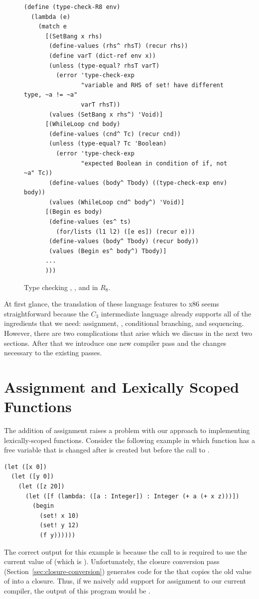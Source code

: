 \documentclass[11pt]{book}
\begin{document}
\begin{figure}[tbp]
\begin{lstlisting}[basicstyle=\ttfamily\footnotesize]
(define (type-check-R8 env)
  (lambda (e)
    (match e
      [(SetBang x rhs)
       (define-values (rhs^ rhsT) (recur rhs))
       (define varT (dict-ref env x))
       (unless (type-equal? rhsT varT)
         (error 'type-check-exp
                "variable and RHS of set! have different type, ~a != ~a"
                varT rhsT))
       (values (SetBang x rhs^) 'Void)]
      [(WhileLoop cnd body)
       (define-values (cnd^ Tc) (recur cnd))
       (unless (type-equal? Tc 'Boolean)
         (error 'type-check-exp
                "expected Boolean in condition of if, not ~a" Tc))
       (define-values (body^ Tbody) ((type-check-exp env) body))
       (values (WhileLoop cnd^ body^) 'Void)]
      [(Begin es body)
       (define-values (es^ ts)
         (for/lists (l1 l2) ([e es]) (recur e)))
       (define-values (body^ Tbody) (recur body))
       (values (Begin es^ body^) Tbody)]
      ...
      )))
\end{lstlisting}
\caption{Type checking , ,
    and  in $R_8$.}
\label{fig:type-check-R8}
\end{figure}


  
At first glance, the translation of these language features to x86
seems straightforward because the $C_3$ intermediate language already
supports all of the ingredients that we need: assignment, ,
conditional branching, and sequencing. However, there are two
complications that arise which we discuss in the next two
sections. After that we introduce one new compiler pass and the
changes necessary to the existing passes.

\section{Assignment and Lexically Scoped Functions}
\label{sec:assignment-scoping}

The addition of assignment raises a problem with our approach to
implementing lexically-scoped functions. Consider the following
example in which function  has a free variable  that
is changed after  is created but before the call to .
\begin{lstlisting}
(let ([x 0])
  (let ([y 0])
    (let ([z 20])
      (let ([f (lambda: ([a : Integer]) : Integer (+ a (+ x z)))])
        (begin
          (set! x 10)
          (set! y 12)
          (f y))))))
\end{lstlisting}
The correct output for this example is  because the call to
 is required to use the current value of  (which is
). Unfortunately, the closure conversion pass
(Section~\ref{sec:closure-conversion}) generates code for the
 that copies the old value of  into a
closure. Thus, if we naively add support for assignment to our current
compiler, the output of this program would be .
\end{document}
